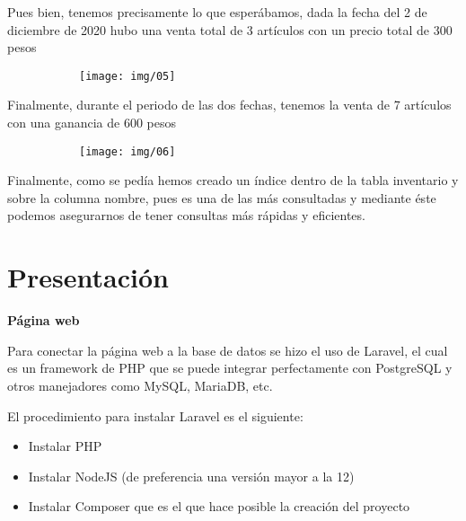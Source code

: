 \documentclass[letterpaper,12pt]{article}
\begin{document}
	Pues bien, tenemos precisamente lo que esperábamos, dada la fecha del 2 de diciembre de 2020 hubo una venta total de 3 artículos con un precio total de 300 pesos 
	
	\begin{figure}[H]

		\begin{subfigure}{20cm}

			\centering

			\texttt{[image: img/05]}

		\end{subfigure}

	\end{figure}
	
	Finalmente, durante el periodo de las dos fechas, tenemos la venta de 7 artículos con una ganancia de 600 pesos
	
	\begin{figure}[H]

		\begin{subfigure}{20cm}

			\centering

			\texttt{[image: img/06]}

		\end{subfigure}

	\end{figure}

	Finalmente, como se pedía hemos creado un índice dentro de la tabla inventario y sobre la columna nombre, pues es una de las más consultadas y mediante éste podemos asegurarnos de tener consultas más rápidas y eficientes. 
	
	
	
	\section{Presentación}
	
	\textbf{Página web}
	
	Para conectar la página web a la base de datos se hizo el uso de Laravel, el cual es un framework de PHP que se puede integrar perfectamente con PostgreSQL y otros manejadores como MySQL, MariaDB, etc.
	
	El procedimiento para instalar Laravel es el siguiente:
	
	\begin{itemize}
		\item Instalar PHP
		\item Instalar NodeJS (de preferencia una versión mayor a la 12)
		\item Instalar Composer que es el que hace posible la creación del proyecto
	\end{itemize}
\end{document}

